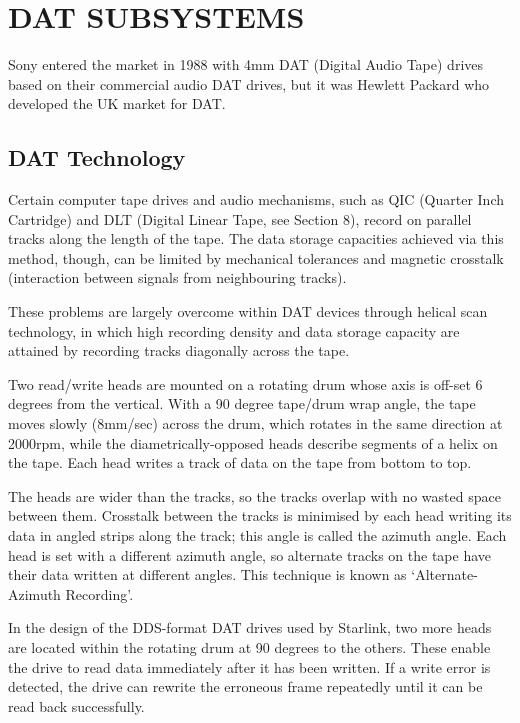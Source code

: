 \documentclass[11pt]{article}
\begin{document}
\section {DAT SUBSYSTEMS}

Sony entered the market in 1988 with 4mm DAT (Digital Audio Tape) drives based
on their commercial audio DAT drives, but it was Hewlett Packard who developed
the UK market for DAT.

\subsection {DAT Technology}

Certain computer tape drives and audio mechanisms, such as QIC (Quarter
Inch Cartridge) and DLT (Digital Linear Tape, see Section 8), record on
parallel tracks along the length of the tape. The data storage capacities
achieved via this method, though, can be limited by mechanical tolerances
and magnetic crosstalk (interaction between signals from neighbouring tracks).

These problems are largely overcome within DAT devices through helical scan
technology, in which high recording density and data storage capacity are
attained by recording tracks diagonally across the tape.

Two read/write heads are mounted on a rotating drum whose axis is off-set
6 degrees from the vertical. With a 90 degree tape/drum wrap angle, the tape
moves slowly (8mm/sec) across the drum, which rotates in the same direction
at 2000rpm, while the diametrically-opposed heads describe segments of a
helix on the tape. Each head writes a track of data on the tape from bottom
to top.

The heads are wider than the tracks, so the tracks overlap with no wasted
space between them. Crosstalk between the tracks is minimised by each head
writing its data in angled strips along the track; this angle is called the
azimuth angle. Each head is set with a different azimuth angle, so alternate
tracks on the tape have their data written at different angles. This
technique is known as `Alternate-Azimuth Recording'.

In the design of the DDS-format DAT drives used by Starlink, two more heads
are located within the rotating drum at 90 degrees to the others. These
enable the drive to read data immediately after it has been written. If a
write error is detected, the drive can rewrite the erroneous frame repeatedly
until it can be read back successfully.
\end{document}
